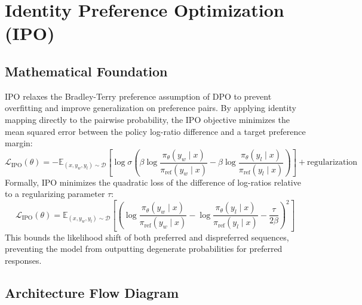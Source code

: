\documentclass{article}
\begin{document}
\newpage
\section{Identity Preference Optimization (IPO)}

\subsection{Mathematical Foundation}
IPO relaxes the Bradley-Terry preference assumption of DPO to prevent overfitting and improve generalization on preference pairs. By applying identity mapping directly to the pairwise probability, the IPO objective minimizes the mean squared error between the policy log-ratio difference and a target preference margin:
\begin{equation}
  \mathcal{L}_{\text{IPO}}(\theta) = -\mathbb{E}_{(x, y_w, y_l) \sim \mathcal{D}} \left[ \log \sigma \left( \beta \log \frac{\pi_\theta(y_w \mid x)}{\pi_{\text{ref}}(y_w \mid x)} - \beta \log \frac{\pi_\theta(y_l \mid x)}{\pi_{\text{ref}}(y_l \mid x)} \right) \right] + \text{regularization}
\end{equation}
Formally, IPO minimizes the quadratic loss of the difference of log-ratios relative to a regularizing parameter $\tau$:
\begin{equation}
  \mathcal{L}_{\text{IPO}}(\theta) = \mathbb{E}_{(x, y_w, y_l) \sim \mathcal{D}} \left[ \left( \log \frac{\pi_\theta(y_w \mid x)}{\pi_{\text{ref}}(y_w \mid x)} - \log \frac{\pi_\theta(y_l \mid x)}{\pi_{\text{ref}}(y_l \mid x)} - \frac{\tau}{2 \beta} \right)^2 \right]
\end{equation}
This bounds the likelihood shift of both preferred and dispreferred sequences, preventing the model from outputting degenerate probabilities for preferred responses.

\subsection{Architecture Flow Diagram}
\end{document}
